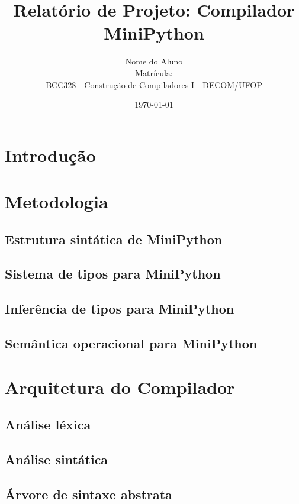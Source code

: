 \documentclass[12pt,a4paper]{article}
\title{Relatório de Projeto: Compilador MiniPython}
\author{
    Nome do Aluno \\
    Matrícula: \\
    BCC328 - Construção de Compiladores I - DECOM/UFOP
}
\date{\today}
\begin{document}
\maketitle

\begin{abstract}
\end{abstract}

\tableofcontents

\section{Introdução}

\section{Metodologia}

\subsection{Estrutura sintática de MiniPython}

\subsection{Sistema de tipos para MiniPython}

\subsection{Inferência de tipos para MiniPython}

\subsection{Semântica operacional para MiniPython}


\section{Arquitetura do Compilador}

\subsection{Análise léxica}

\subsection{Análise sintática}

\subsection{Árvore de sintaxe abstrata}
\end{document}
